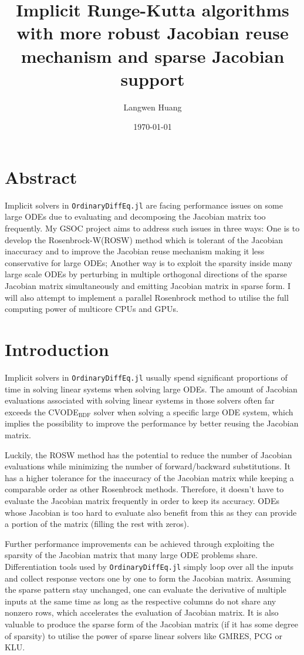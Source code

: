 \documentclass[a4paper]{article}
\author{Langwen Huang}
\date{\today}
\title{Implicit Runge-Kutta algorithms with more robust Jacobian reuse mechanism and sparse Jacobian support}
\begin{document}
\maketitle
\tableofcontents

\section{Abstract}
\label{sec:org39bce53}
Implicit solvers in \texttt{OrdinaryDiffEq.jl} are facing performance issues on some
large ODEs due to evaluating and decomposing the Jacobian matrix too frequently.
My GSOC project aims to address such issues in three ways: One is to develop the
Rosenbrock-W(ROSW) method which is tolerant of the Jacobian inaccuracy and to
improve the Jacobian reuse mechanism making it less conservative for large ODEs;
Another way is to exploit the sparsity inside many large scale ODEs by
perturbing in multiple orthogonal directions of the sparse Jacobian matrix
simultaneously and emitting Jacobian matrix in sparse form. I will also attempt
to implement a parallel Rosenbrock method to utilise the full computing power of
multicore CPUs and GPUs.

\section{Introduction}
\label{sec:orgffb08ad}
Implicit solvers in \texttt{OrdinaryDiffEq.jl} usually spend significant proportions of
time in solving linear systems when solving large ODEs. The amount of Jacobian
evaluations associated with solving linear systems in those solvers often far
exceeds the CVODE\(_{\text{BDF}}\) solver when solving a specific large ODE system, which
implies the possibility to improve the performance by better reusing the
Jacobian matrix.

Luckily, the ROSW method has the potential to reduce the number of Jacobian
evaluations while minimizing the number of forward/backward substitutions. It
has a higher tolerance for the inaccuracy of the Jacobian matrix while keeping a
comparable order as other Rosenbrock methods. Therefore, it doesn't have to
evaluate the Jacobian matrix frequently in order to keep its accuracy. ODEs whose
Jacobian is too hard to evaluate \cite{one} also benefit from this as they can
provide a portion of the matrix (filling the rest with zeros). 

Further performance improvements can be achieved through exploiting the sparsity
of the Jacobian matrix that many large ODE problems share. Differentiation tools
used by \texttt{OrdinaryDiffEq.jl} simply loop over all the inputs and collect response
vectors one by one to form the Jacobian matrix. Assuming the sparse pattern stay
unchanged, one can evaluate the derivative of multiple inputs at the same time
as long as the respective columns do not share any nonzero rows, which
accelerates the evaluation of Jacobian matrix. It is also valuable to produce
the sparse form of the Jacobian matrix (if it has some degree of sparsity) to
utilise the power of sparse linear solvers like GMRES, PCG or KLU. 
\end{document}
